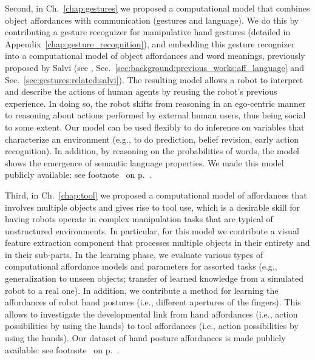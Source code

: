 Second, in Ch.~\ref{chap:gestures} we proposed a computational model that combines object affordances with communication (gestures and language).
We do this by contributing a gesture recognizer for manipulative hand gestures (detailed in Appendix~\ref{chap:gesture_recognition}), and embedding this gesture recognizer into a computational model of object affordances and word meanings, previously proposed by Salvi (see \cite{salvi:2012:smcb}, Sec.~\ref{sec:background:previous_works:aff_language} and Sec.~\ref{sec:gestures:related:salvi}).
The resulting model allows a robot to interpret and describe the actions of human agents by reusing the robot's previous experience.
In doing so, the robot shifts from reasoning in an ego-centric manner to reasoning about actions performed by external human users, thus being social to some extent.
Our model can be used flexibly to do inference on variables that characterize an environment (e.g., to do prediction, belief revision, early action recognition).
In addition, by reasoning on the probabilities of words, the model shows the emergence of semantic language properties.
We made this model publicly available: see footnote~ on p.~\pageref{footnote:tcds-gestures_url}.

Third, in Ch.~\ref{chap:tool} we proposed a computational model of affordances that involves multiple objects and gives rise to tool use, which is a desirable skill for having robots operate in complex manipulation tasks that are typical of unstructured environments.
In particular, for this model we contribute a visual feature extraction component that processes multiple objects in their entirety and in their sub-parts.
In the learning phase, we evaluate various types of computational affordance models and parameters for assorted tasks (e.g., generalization to unseen objects; transfer of learned knowledge from a simulated robot to a real one).
In addition, we contribute a method for learning the affordances of robot hand postures (i.e., different apertures of the fingers).
This allows to investigate the developmental link from hand affordances (i.e., action possibilities by using the hands) to tool affordances (i.e., action possibilities by using the hands).
Our dataset of hand posture affordances is made publicly available: see footnote~ on p.~\pageref{footnote:hand_aff_dataset}.

